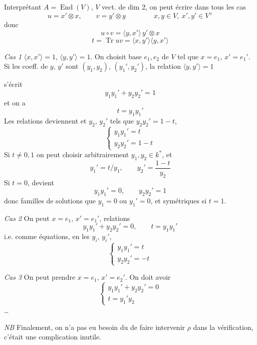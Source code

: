 \documentclass[11pt,a4paper]{article}
\begin{document}
Interprétant $A=\operatorname{End}(V)$, $V$ vect. de dim 2, on peut écrire dans tous les cas
\[ u = x'\otimes x , \qquad v = y'\otimes y \qquad\qquad x,y\in V,\ x',y'\in V^{\vee} \]
donc
\[ u\circ v = \langle y,x'\rangle\, y'\otimes x \]
\[ t = \operatorname{Tr} uv = \langle x,y'\rangle\langle y,x'\rangle \]

\emph{Cas 1} \struck{\ill{}} $\langle x,x'\rangle=1$, $\langle y,y'\rangle=1$.
On choisit base $e_1,e_2$ de $V$ tel que $x=e_1$, $x'=e_1'$. Si les coeff. de $y$, $y'$ sont $(y_1,y_2)$, $(y_1',y_2')$, la relation $\langle y,y'\rangle=1$

s'écrit
\[ y_1y_1' + y_2y_2' = 1 \]
et on a
\[ t = y_1y_1' \]
 Les relations deviennent  et $y_2$, $y_2'$ tels que $y_2y_2'=1-t$,
\[ \begin{cases} y_1y_1' = t \\ y_2y_2' = 1-t \end{cases} \]
Si $t\neq0,1$ on peut choisir arbitrairement $y_1,y_2 \in k^*$, et  
\[ y_1' = t/y_1 , \qquad y_2' = \frac{1-t}{y_2} \]
Si $t=0$, \struck{\ill{}}  devient
\[ y_1y_1' = 0 , \qquad y_2y_2' = 1 \]
donc familles de solutions  que $y_1=0$ ou $y_1'=0$, et symétriques si $t=1$.

\emph{Cas 2} On peut  $x=e_1$, $x'=e_1'$, relations
\[ y_1y_1' + y_2y_2' = 0 , \qquad t = y_1y_1' \]
i.e. comme \ill{} équations, en les $y_i$, $y_i'$, \struck{\ill{}}
\[ \begin{cases} y_1y_1' = t \\ y_2y_2' = -t \end{cases} \]

\emph{Cas 3} On peut prendre $x=e_1$, $x'=e_2'$.
\struck{\ill{}}
On doit avoir
\[ \begin{cases} y_1y_1' + y_2y_2' = 0 \\ t = y_1'y_2 \end{cases} \]
…

\emph{NB} Finalement, on n'a pas eu besoin du \struck{\ill{}} de faire intervenir $\rho$ dans la vérification, c'était une complication inutile.
\end{document}
